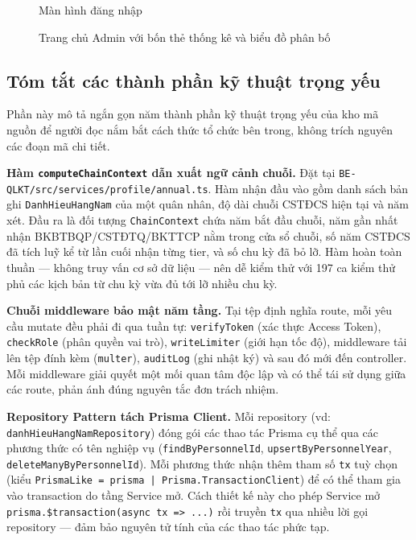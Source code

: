 \documentclass[../DoAn.tex]{subfiles}
\begin{document}
\begin{figure}[H]
    \centering
    \caption{Màn hình đăng nhập}
    \label{fig:gd-dangnhap}
\end{figure}

\begin{figure}[H]
    \centering
    \caption{Trang chủ Admin với bốn thẻ thống kê và biểu đồ phân bố}
    \label{fig:gd-trangchu-admin}
\end{figure}

\subsection{Tóm tắt các thành phần kỹ thuật trọng yếu}
\label{subsection:4.3.4}

Phần này mô tả ngắn gọn năm thành phần kỹ thuật trọng yếu của kho mã nguồn để người đọc nắm bắt cách thức tổ chức bên trong, không trích nguyên các đoạn mã chi tiết.

\textbf{Hàm \texttt{computeChainContext} dẫn xuất ngữ cảnh chuỗi.} Đặt tại \texttt{BE-QLKT/src/services/profile/annual.ts}. Hàm nhận đầu vào gồm danh sách bản ghi \texttt{DanhHieuHangNam} của một quân nhân, độ dài chuỗi CSTĐCS hiện tại và năm xét. Đầu ra là đối tượng \texttt{ChainContext} chứa năm bắt đầu chuỗi, năm gần nhất nhận BKBTBQP/CSTĐTQ/BKTTCP nằm trong cửa sổ chuỗi, số năm CSTĐCS đã tích luỹ kể từ lần cuối nhận từng tier, và số chu kỳ đã bỏ lỡ. Hàm hoàn toàn thuần --- không truy vấn cơ sở dữ liệu --- nên dễ kiểm thử với 197 ca kiểm thử phủ các kịch bản từ chu kỳ vừa đủ tới lỡ nhiều chu kỳ.

\textbf{Chuỗi middleware bảo mật năm tầng.} Tại tệp định nghĩa route, mỗi yêu cầu mutate đều phải đi qua tuần tự: \texttt{verifyToken} (xác thực Access Token), \texttt{checkRole} (phân quyền vai trò), \texttt{writeLimiter} (giới hạn tốc độ), middleware tải lên tệp đính kèm (\texttt{multer}), \texttt{auditLog} (ghi nhật ký) và sau đó mới đến controller. Mỗi middleware giải quyết một mối quan tâm độc lập và có thể tái sử dụng giữa các route, phản ánh đúng nguyên tắc đơn trách nhiệm.

\textbf{Repository Pattern tách Prisma Client.} Mỗi repository (vd: \texttt{danhHieuHangNamRepository}) đóng gói các thao tác Prisma cụ thể qua các phương thức có tên nghiệp vụ (\texttt{findByPersonnelId}, \texttt{upsertByPersonnelYear}, \texttt{deleteManyByPersonnelId}). Mỗi phương thức nhận thêm tham số \texttt{tx} tuỳ chọn (kiểu \texttt{PrismaLike = prisma | Prisma.TransactionClient}) để có thể tham gia vào transaction do tầng Service mở. Cách thiết kế này cho phép Service mở \texttt{prisma.\$transaction(async tx => ...)} rồi truyền \texttt{tx} qua nhiều lời gọi repository --- đảm bảo nguyên tử tính của các thao tác phức tạp.
\end{document}
